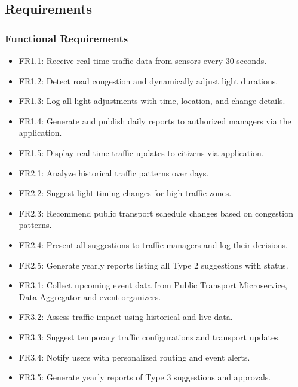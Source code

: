 \newpage
\subsection{Requirements}
\subsubsection{Functional Requirements}

\begin{itemize}
    \item FR1.1: Receive real-time traffic data from sensors every 30 seconds.
    \item FR1.2: Detect road congestion and dynamically adjust light durations.
    \item FR1.3: Log all light adjustments with time, location, and change details.
    \item FR1.4: Generate and publish daily reports to authorized managers via the application.
    \item FR1.5: Display real-time traffic updates to citizens via application.

    \item FR2.1: Analyze historical traffic patterns over days.
    \item FR2.2: Suggest light timing changes for high-traffic zones.
    \item FR2.3: Recommend public transport schedule changes based on congestion patterns.
    \item FR2.4: Present all suggestions to traffic managers and log their decisions.
    \item FR2.5: Generate yearly reports listing all Type 2 suggestions with status.

    \item FR3.1: Collect upcoming event data from Public Transport Microservice, Data Aggregator and event organizers.
    \item FR3.2: Assess traffic impact using historical and live data.
    \item FR3.3: Suggest temporary traffic configurations and transport updates.
    \item FR3.4: Notify users with personalized routing and event alerts.
    \item FR3.5: Generate yearly reports of Type 3 suggestions and approvals.
\end{itemize}


\newpage

